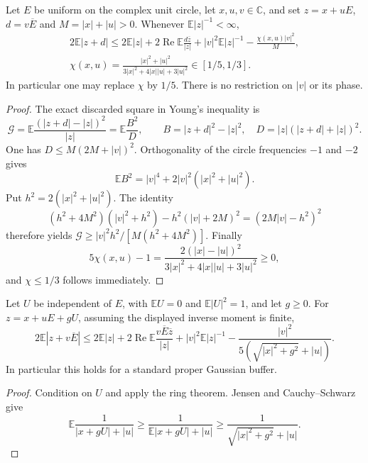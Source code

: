 \begin{theorem}
Let $E$ be uniform on the complex unit circle, let $x,u,v\in\mathbb C$, and set $z=x+uE$, $d=v\overline E$ and $M=|x|+|u|>0$. Whenever $\mathbb E|z|^{-1}<\infty$,
\begin{align*}
2\mathbb E|z+d|\le 2\mathbb E|z|
 +2\operatorname{Re}\mathbb E\frac{d\overline z}{|z|}
 +|v|^2\mathbb E|z|^{-1}-\frac{\chi(x,u)|v|^2}{M},\\
\chi(x,u)=\frac{|x|^2+|u|^2}{3|x|^2+4|x||u|+3|u|^2}
\in[1/5,1/3].
\end{align*}
In particular one may replace $\chi$ by $1/5$. There is no restriction on $|v|$ or its phase.
\end{theorem}
\begin{proof}
The exact discarded square in Young's inequality is
\[
\mathcal G=\mathbb E\frac{(|z+d|-|z|)^2}{|z|}
=\mathbb E\frac{B^2}{D},\qquad
B=|z+d|^2-|z|^2,\quad D=|z|(|z+d|+|z|)^2.
\]
One has $D\le M(2M+|v|)^2$. Orthogonality of the circle frequencies $-1$ and $-2$ gives
\[
\mathbb E B^2=|v|^4+2|v|^2(|x|^2+|u|^2).
\]
Put $h^2=2(|x|^2+|u|^2)$. The identity
\[
(h^2+4M^2)(|v|^2+h^2)-h^2(|v|+2M)^2=(2M|v|-h^2)^2
\]
therefore yields $\mathcal G\ge |v|^2h^2/[M(h^2+4M^2)]$. Finally
\[
5\chi(x,u)-1=
\frac{2(|x|-|u|)^2}{3|x|^2+4|x||u|+3|u|^2}\ge0,
\]
and $\chi\le1/3$ follows immediately.
\end{proof}

\begin{corollary}
Let $U$ be independent of $E$, with $\mathbb EU=0$ and $\mathbb E|U|^2=1$, and let $g\ge0$. For $z=x+uE+gU$, assuming the displayed inverse moment is finite,
\[
2\mathbb E|z+v\overline E|\le2\mathbb E|z|
 +2\operatorname{Re}\mathbb E\frac{v\overline E\overline z}{|z|}
 +|v|^2\mathbb E|z|^{-1}
 -\frac{|v|^2}{5(\sqrt{|x|^2+g^2}+|u|)}.
\]
In particular this holds for a standard proper Gaussian buffer.
\end{corollary}
\begin{proof}
Condition on $U$ and apply the ring theorem. Jensen and Cauchy--Schwarz give
\[
\mathbb E\frac1{|x+gU|+|u|}
\ge\frac1{\mathbb E|x+gU|+|u|}
\ge\frac1{\sqrt{|x|^2+g^2}+|u|}.
\]
\end{proof}

